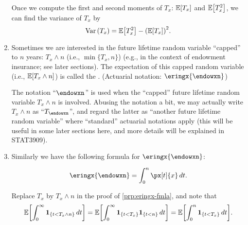 \begin{enumerate}
Once we compute the first and second moments of \(T_x\): \(\mathbb{E}\qty[T_x]\) and
\(\mathbb{E}\qty[T_x^2]\), we can find the variance of \(T_x\) by
\[
\operatorname{Var}\qty(T_x)=\mathbb{E}\qty[T_x^2]-\qty(\mathbb{E}\qty[T_x])^2.
\]

\item Sometimes we are interested in the future lifetime random variable
``capped'' to \(n\) years: \(T_x\wedge n\) (i.e.,
\(\min\{T_x, n\}\)) (e.g., in the context of endowment insurance; see later
sections). The expectation of this capped random variable (i.e.,
\(\mathbb{E}\qty[T_x\wedge n]\)) is called the .
(Actuarial notation: \(\eringx{\endowxn}\))

\begin{note}
The notation ``\(\endowxn\)'' is used when the ``capped'' future lifetime
random variable \(T_x\wedge n\) is involved. Abusing the notation a bit, we may
actually write \(T_x\wedge n\) as ``\(T_{\endowxn}\)'', and regard the latter
as ``another future lifetime random variable'' where ``standard'' actuarial
notations apply (this will be useful in some later sections here, and more
details will be explained in STAT3909).
\end{note}

\item Similarly we have the following formula for \(\eringx{\endowxn}\):
\begin{proposition}
\label{prp:eringxn-fmla}
\[
\eringx{\endowxn}=\int_{0}^{n}\px[t]{x}\,dt.
\]
\end{proposition}
\begin{pf}
Replace \(T_x\) by \(T_x\wedge n\) in the proof of \cref{prp:eringx-fmla}, and note that
\[
\mathbb{E}\qty[\int_{0}^{\infty}\mathbf{1}_{\left\{t<T_x\wedge n\right\}}\,dt]
=\mathbb{E}\qty[\int_{0}^{\infty}\mathbf{1}_{\left\{t<T_x\right\}}\mathbf{1}_{\left\{t<n\right\}}\,dt]
=\mathbb{E}\qty[\int_{0}^{n}\mathbf{1}_{\left\{t<T_x\right\}}\,dt].
\]
\end{pf}
\end{enumerate}

